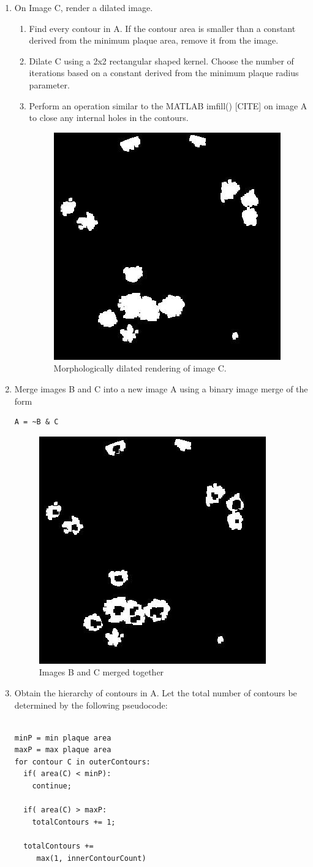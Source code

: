 \documentclass[11pt,final,twocolumn]{IEEEtran}
\begin{document}
\begin{enumerate}
\item On Image C, render a dilated image.
\begin{enumerate}
\item  Find every contour in A. If the contour area is smaller than a constant derived from the minimum plaque area, remove it from the image.
\item  Dilate C using a 2x2 rectangular shaped kernel. Choose the number of iterations based on a constant derived from the minimum plaque radius parameter.
\item  Perform an  operation similar to the MATLAB imfill() [CITE] on image A to close any internal holes in the contours.
\begin{figure}[H]
\centering
\includegraphics[width=.25\textwidth]{countDilateC.jpg}
\caption{Morphologically dilated rendering of image C.}
\label{fig:countDilateC}
\end{figure}
\end{enumerate}

\item
Merge images B and C into a new image A using a binary image merge of the form 
\begin{Verbatim}[samepage=true]
A = ~B & C
\end{Verbatim}
\begin{figure}[H]
\centering
\includegraphics[width=.25\textwidth]{countMerged.jpg}
\caption{Images B and C merged together}
\label{fig:countMerged}
\end{figure}

\item
Obtain the hierarchy of contours in A. Let the total number of contours be determined by the following pseudocode:
\begin{Verbatim}[samepage=true]

minP = min plaque area
maxP = max plaque area
for contour C in outerContours:
  if( area(C) < minP):
    continue;

  if( area(C) > maxP:
    totalContours += 1;

  totalContours +=
     max(1, innerContourCount) 
\end{Verbatim}

\end{enumerate}
\end{document}

